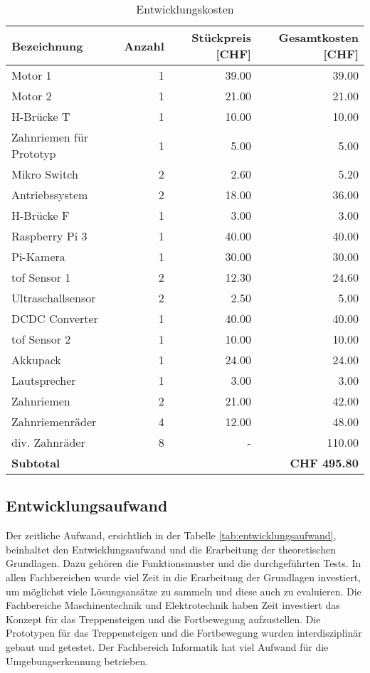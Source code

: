 \begin{center}
\centering
\begin{table}[H]
\begin{tabular}{|l|r|r|r|}
\hline 
\textbf{Bezeichnung} & \textbf{Anzahl} &
\textbf{Stückpreis [CHF]} & \textbf{Gesamtkosten [CHF]} \\
\hline 
Motor 1 & 1 & 39.00 & 39.00 \\
\hline
Motor 2 & 1 & 21.00 & 21.00 \\
\hline
H-Brücke T & 1 & 10.00 & 10.00\\
\hline
Zahnriemen für Prototyp & 1 & 5.00 & 5.00 \\
\hline
Mikro Switch & 2 & 2.60  & 5.20\\
\hline
Antriebssystem & 2 & 18.00  & 36.00\\
\hline
H-Brücke F & 1 & 3.00 & 3.00 \\
\hline
Raspberry Pi 3 & 1 & 40.00 & 40.00 \\
\hline
Pi-Kamera & 1 & 30.00 & 30.00 \\
\hline
\acrshort{tof} Sensor 1 & 2 & 12.30 & 24.60 \\
\hline
Ultraschallsensor & 2 & 2.50 & 5.00 \\
\hline
DCDC Converter & 1 & 40.00 & 40.00 \\
\hline
\acrshort{tof} Sensor 2 & 1 & 10.00 & 10.00 \\
\hline
Akkupack & 1 & 24.00  & 24.00 \\
\hline
Lautsprecher & 1 & 3.00 & 3.00\\
\hline 
Zahnriemen & 2 & 21.00 & 42.00\\
\hline
Zahnriemenräder & 4 & 12.00 & 48.00\\
\hline
div. Zahnräder & 8 & - & 110.00\\
\hline \hline 
 \textbf{Subtotal} &&& \textbf{CHF 495.80}\\
\hline 
\end{tabular}
\caption[Entwicklungskosten]{Entwicklungskosten}
\label{tab:kosten}
\end{table}
\end{center}

\newpage

\subsection{Entwicklungsaufwand}
Der zeitliche Aufwand, ersichtlich in der Tabelle \ref{tab:entwicklungsaufwand}, beinhaltet den Entwicklungsaufwand und die Erarbeitung der theoretischen Grundlagen. Dazu gehören die Funktionsmuster und die durchgeführten Tests. In allen Fachbereichen wurde viel Zeit in die Erarbeitung der Grundlagen investiert, um möglichst viele Lösungsansätze zu sammeln und diese auch zu evaluieren. Die Fachbereiche Maschinentechnik und Elektrotechnik haben Zeit investiert das Konzept für das Treppensteigen und die Fortbewegung aufzustellen. Die Prototypen für das Treppensteigen und die Fortbewegung wurden interdisziplinär gebaut und getestet. Der Fachbereich Informatik hat viel Aufwand für die Umgebungserkennung betrieben.

